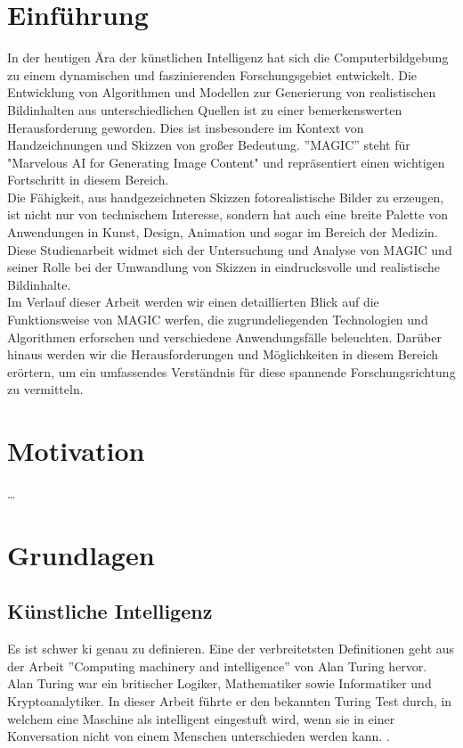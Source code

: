 \documentclass[12pt,a4paper]{article}
\begin{document}
\section{Einführung}
	In der heutigen Ära der künstlichen Intelligenz hat sich die Computerbildgebung zu einem dynamischen und faszinierenden Forschungsgebiet entwickelt. 
	Die Entwicklung von Algorithmen und Modellen zur Generierung von realistischen Bildinhalten aus unterschiedlichen Quellen ist zu einer bemerkenswerten Herausforderung geworden. 
	Dies ist insbesondere im Kontext von Handzeichnungen und Skizzen von großer Bedeutung.
	''MAGIC'' steht für "Marvelous AI for Generating Image Content" und repräsentiert einen wichtigen Fortschritt in diesem Bereich.\\
	Die Fähigkeit, aus handgezeichneten Skizzen fotorealistische Bilder zu erzeugen, ist nicht nur von technischem Interesse, sondern hat auch eine breite Palette von Anwendungen in Kunst, Design, Animation und sogar im Bereich der Medizin. 
	Diese Studienarbeit widmet sich der Untersuchung und Analyse von MAGIC und seiner Rolle bei der Umwandlung von Skizzen in eindrucksvolle und realistische Bildinhalte.\\
	Im Verlauf dieser Arbeit werden wir einen detaillierten Blick auf die Funktionsweise von MAGIC werfen, die zugrundeliegenden Technologien und Algorithmen erforschen und verschiedene Anwendungsfälle beleuchten. 
	Darüber hinaus werden wir die Herausforderungen und Möglichkeiten in diesem Bereich erörtern, um ein umfassendes Verständnis für diese spannende Forschungsrichtung zu vermitteln.
	
\newpage
\section{Motivation}
\dots

\newpage
\section{Grundlagen}
\subsection{Künstliche Intelligenz}
	Es ist schwer \ac{ki} genau zu definieren.
	Eine der verbreitetsten Definitionen geht aus der Arbeit ''Computing machinery and intelligence'' von Alan Turing hervor.
	Alan Turing war ein britischer Logiker, Mathematiker sowie Informatiker und Kryptoanalytiker. 
	In dieser Arbeit führte er den bekannten Turing Test durch, in welchem eine Maschine als intelligent eingestuft wird, wenn sie in einer Konversation nicht von einem Menschen unterschieden werden kann.
	\cite[\ac{vgl}][]{10.1111/bjd.18880}.
\end{document}

